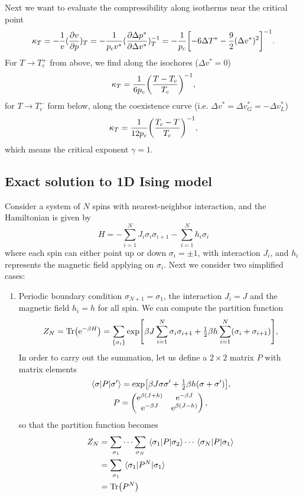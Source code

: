 \documentclass[10pt]{article}
\begin{document}
Next we want to evaluate the compressibility along isotherms near the critical point
\begin{equation}
	\kappa_T = -\frac{1}{v} (\pdv{v}{p})_T = - \frac{1}{p_c v^*} (\pdv{\Delta p^*}{\Delta v^*})^{-1}_T = -\frac{1}{p_c}\qty[-6 \Delta T^* - \frac{9}{2}(\Delta v^*)^2]^{-1}.
\end{equation}
For $T \to T_c^+$ from above, we find along the isochores ($\Delta v^* = 0$)
\begin{equation}
	\kappa_T = \frac{1}{6 p_c} \qty(\frac{T-T_c}{T_c})^{-1},
\end{equation}
for $T \to T_c^-$ form below, along the coexistence curve (i.e. $\Delta v^* = \Delta v^*_{G} = -\Delta v^*_{L}$)
\begin{equation}
	\kappa_T = \frac{1}{12 p_c} \qty(\frac{T_c-T}{T_c})^{-1},
\end{equation}
which means the critical exponent $\gamma = 1$.

\subsection{Exact solution to 1D Ising model}

Consider a system of $N$ spins with nearest-neighbor interaction, and the Hamiltonian is given by
\begin{equation}
	H = - \sum_{i=1}^{N} J_i \sigma_i \sigma_{i+1} - \sum_{i=1}^{N} h_i \sigma_i
\end{equation}
where each spin can either point up or down $\sigma_i = \pm 1$, with interaction $J_i$, and $h_i$ represents the magnetic field applying on $\sigma_i$.
Next we consider two simplified cases:
\begin{enumerate}
	\item Periodic boundary condition $\sigma_{N+1} = \sigma_1$, the interaction $J_i = J$ and the magnetic field $h_i = h$ for all spin. We can compute the partition function
	\begin{equation}
		Z_N = \Tr({\mathrm{e}}^{-\beta H}) = \sum_{\{\sigma_i\}} \exp[\beta J \sum_{i=1}^{N} \sigma_i \sigma_{i+1} + \tfrac{1}{2} \beta h \sum_{i=1}^{N} (\sigma_i + \sigma_{i+1})],
	\end{equation}
	In order to carry out the summation, let us define a $2 \times 2$ matrix $P$ with matrix elements
	\begin{gather}
		\mel{\sigma}{P}{\sigma'} = \exp[\beta J \sigma \sigma' + \thalf \beta h (\sigma + \sigma')], \\
		P = \pmqty{{\e}^{\beta(J+h)} & {\e}^{-\beta J} \\ {\e}^{-\beta J} & {\e}^{\beta(J-h)}},
	\end{gather}
	so that the partition function becomes
	\begin{align*}
		Z_N &= \sum_{\sigma_1} \cdots \sum_{\sigma_N} \mel{\sigma_1}{P}{\sigma_2} \cdots \mel{\sigma_{N}}{P}{\sigma_1} \\
		&= \sum_{\sigma_1} \mel{\sigma_1}{P^N}{\sigma_1} \\
		&= \Tr(P^N)
	\end{align*}
\end{enumerate}
\end{document}
